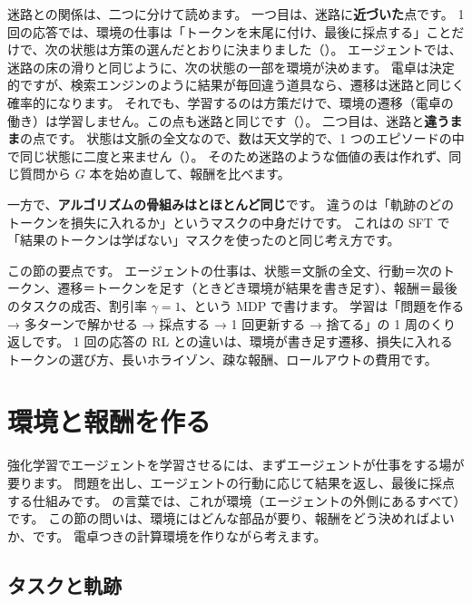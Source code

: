 迷路との関係は、二つに分けて読めます。
一つ目は、迷路に\textbf{近づいた}点です。
1 回の応答では、環境の仕事は「トークンを末尾に付け、最後に採点する」ことだけで、次の状態は方策の選んだとおりに決まりました（）。
エージェントでは、迷路の床の滑りと同じように、次の状態の一部を環境が決めます。
電卓は決定的ですが、検索エンジンのように結果が毎回違う道具なら、遷移は迷路と同じく確率的になります。
それでも、学習するのは方策だけで、環境の遷移（電卓の働き）は学習しません。この点も迷路と同じです（）。
二つ目は、迷路と\textbf{違うまま}の点です。
状態は文脈の全文なので、数は天文学的で、1 つのエピソードの中で同じ状態に二度と来ません（）。
そのため迷路のような価値の表は作れず、同じ質問から $G$ 本を始め直して、報酬を比べます。

一方で、\textbf{アルゴリズムの骨組みはとほとんど同じ}です。
違うのは「軌跡のどのトークンを損失に入れるか」というマスクの中身だけです。
これはの SFT で「結果のトークンは学ばない」マスクを使ったのと同じ考え方です。

この節の要点です。
エージェントの仕事は、状態＝文脈の全文、行動＝次のトークン、遷移＝トークンを足す（ときどき環境が結果を書き足す）、報酬＝最後のタスクの成否、割引率 $\gamma=1$、という MDP で書けます。
学習は「問題を作る → 多ターンで解かせる → 採点する → 1 回更新する → 捨てる」の 1 周のくり返しです。
1 回の応答の RL との違いは、環境が書き足す遷移、損失に入れるトークンの選び方、長いホライゾン、疎な報酬、ロールアウトの費用です。

\section{環境と報酬を作る}\label{sec:arl-env}

強化学習でエージェントを学習させるには、まずエージェントが仕事をする場が要ります。
問題を出し、エージェントの行動に応じて結果を返し、最後に採点する仕組みです。
の言葉では、これが環境（エージェントの外側にあるすべて）です。
この節の問いは、環境にはどんな部品が要り、報酬をどう決めればよいか、です。
電卓つきの計算環境を作りながら考えます。

\subsection{タスクと軌跡}

